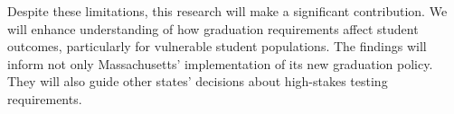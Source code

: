 \documentclass[12pt]{article}
\begin{document}
Despite these limitations, this research will make a significant contribution. We will enhance understanding of how graduation requirements affect student outcomes, particularly for vulnerable student populations. The findings will inform not only Massachusetts' implementation of its new graduation policy. They will also guide other states' decisions about high-stakes testing requirements.



\end{document}
